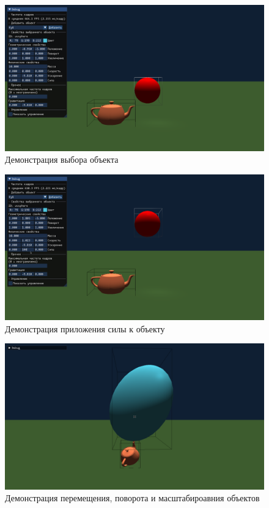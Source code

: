 \begin{figure}[H]
	\centering
	\includegraphics[width=\textwidth]{img/demo-select.png}
	\caption{Демонстрация выбора объекта}
	\label{fig:select}
\end{figure}

\begin{figure}[H]
	\centering
	\includegraphics[width=\textwidth]{img/demo-force.png}
	\caption{Демонстрация приложения силы к объекту}
	\label{fig:force}
\end{figure}

\begin{figure}[H]
	\centering
	\includegraphics[width=\textwidth]{img/demo-transform.png}
	\caption{Демонстрация перемещения, поворота и масштабироавния объектов}
	\label{fig:transform}
\end{figure}

